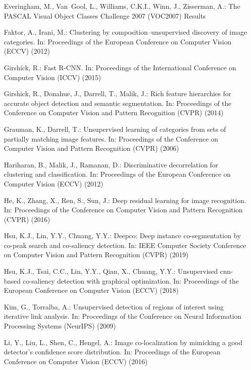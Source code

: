 \documentclass[runningheads]{llncs}
\begin{document}
\begin{thebibliography}{10}
Everingham, M., Van~Gool, L., Williams, C.K.I., Winn, J., Zisserman, A.: The
  {PASCAL} {V}isual {O}bject {C}lasses {C}hallenge 2007 {(VOC2007)} {R}esults

Faktor, A., Irani, M.: Clustering by composition--unsupervised discovery of
  image categories. In: Proceedings of the European Conference on Computer
  Vision ({ECCV}) (2012)

Girshick, R.: {Fast R-CNN}. In: Proceedings of the International Conference on
  Computer Vision ({ICCV}) (2015)

Girshick, R., Donahue, J., Darrell, T., Malik, J.: Rich feature hierarchies for
  accurate object detection and semantic segmentation. In: Proceedings of the
  Conference on Computer Vision and Pattern Recognition ({CVPR}) (2014)

Grauman, K., Darrell, T.: Unsupervised learning of categories from sets of
  partially matching image features. In: Proceedings of the Conference on
  Computer Vision and Pattern Recognition ({CVPR}) (2006)

Hariharan, B., Malik, J., Ramanan, D.: Discriminative decorrelation for
  clustering and classification. In: Proceedings of the European Conference on
  Computer Vision ({ECCV}) (2012)

He, K., Zhang, X., Ren, S., Sun, J.: Deep residual learning for image
  recognition. In: Proceedings of the Conference on Computer Vision and Pattern
  Recognition ({CVPR}) (2016)

Hsu, K.J., Lin, Y.Y., Chuang, Y.Y.: Deepco: Deep instance co-segmentation
  by co-peak search and co-saliency detection. In: IEEE Computer Society
  Conference on Computer Vision and Pattern Recognition (CVPR) (2019)

Hsu, K.J., Tsai, C.C., Lin, Y.Y., Qian, X., Chuang, Y.Y.: Unsupervised
  cnn-based co-saliency detection with graphical optimization. In: Proceedings
  of the European Conference on Computer Vision ({ECCV}) (2018)

Kim, G., Torralba, A.: Unsupervised detection of regions of interest using
  iterative link analysis. In: Proceedings of the Conference on Neural
  Information Processing Systems ({NeurIPS}) (2009)

Li, Y., Liu, L., Shen, C., Hengel, A.: Image co-localization by mimicking a
  good detector's confidence score distribution. In: Proceedings of the
  European Conference on Computer Vision ({ECCV}) (2016)


\end{thebibliography}
\end{document}
